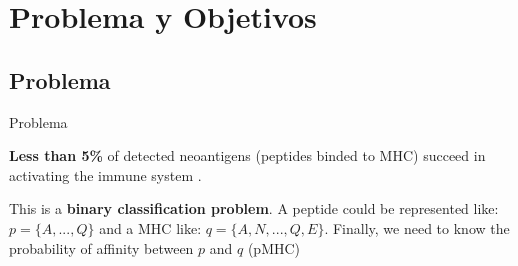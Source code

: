 \documentclass[10pt]{beamer}
\newcommand{\1}{
	\setbeamertemplate{background}{
		\texttt{[image: img/1]}
		\tikz[overlay] \fill[fill opacity=0.75,fill=white] (0,0) rectangle (-\paperwidth,\paperheight);
	}
}
\begin{document}
\section{Problema y Objetivos}

\subsection{Problema}

\begin{frame}{Problema}{}
	
	\begin{block}{}
		\textbf{Less than 5\%} of detected neoantigens (peptides binded to MHC) succeed in activating the immune system \cite{de2020neoantigen}.
	\end{block}
	
	
	\begin{block}{}
		This is a \textbf{binary classification problem}. A peptide could be represented like: $p = \{ A, ... , Q \}$ and a MHC like: $q = \{ A, N, ... ,Q, E \}$. Finally, we need to know the probability of affinity between $p$ and $q$ (pMHC)
	\end{block}
	
	
\end{frame}
\end{document}
